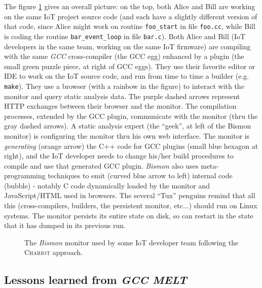 The figure \ref{fig:bismonit} gives an overall picture: on the top,
both Alice and Bill are working on the same IoT project source code
(and each have a slightly different version of that code, since Alice
might work on routine \texttt{foo\_start} in file \texttt{foo.cc},
while Bill is coding the routine \texttt{bar\_event\_loop} in file
\texttt{bar.c}). Both Alice and Bill (IoT developers in the same team,
working on the same IoT firmware) are compiling with the same
\emph{GCC} cross-compiler (the GCC egg) enhanced by a plugin (the
small green puzzle piece, at right of GCC eggs). They use their
favorite editor or IDE to work on the IoT source code, and run from
time to time a builder (e.g. \texttt{make}). They use a browser (with
a rainbow in the figure) to interact with the monitor and query static
analysis data. The purple dashed arrows represent HTTP exchanges
between their browser and the monitor. The compilation processes,
extended by the GCC plugin, communicate with the monitor (thru the
gray dashed arrows). A static analysis expert (the ``geek'', at left
of the Bismon monitor) is configuring the monitor thru his own web
interface. The monitor is \emph{generating} (orange arrow) the C++
code for GCC plugins (small blue hexagon at right), and the IoT
developer needs to change his/her build procedures to compile and use
that generated GCC plugin. \emph{Bismon} also uses meta-programming
techniques to emit (curved blue arrow to left) internal code (bubble)
- notably C code dynamically loaded by the monitor and JavaScript/HTML
used in browsers. The several ``Tux'' penguins remind that all
this (cross-compilers, builders, the persistent monitor, etc...)
should run on Linux systems. The monitor persists its entire state on
disk, so can restart in the state that it has dumped in its previous
run.

\begin{figure}
  \begin{center}
  \end{center}
  \caption{The \emph{Bismon} monitor used by some IoT developer team following the \textsc{Chariot} approach.}
  \label{fig:bismonit}
\end{figure}

\newpage 


\subsection{Lessons learned from \textit{GCC MELT}}
\label{subsec:lessonsgccmelt}


